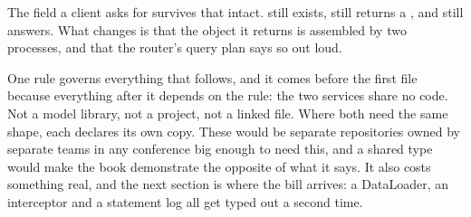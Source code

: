 %
The field a client asks for survives that intact.  still
exists, still returns a , and still answers. What changes is that
the object it returns is assembled by two processes, and that the router's
query plan says so out loud.

%
One rule governs everything that follows, and it comes before the first file
because everything after it depends on the rule: the two services share no code.
Not a model library, not a  project, not a linked file. Where
both need the same shape, each declares its own copy. These would be separate
repositories owned by separate teams in any conference big enough to need
this, and a shared type would make the book demonstrate the opposite of what
it says. It also costs something real, and the next section is where the
bill arrives: a DataLoader, an interceptor and a statement log all get typed
out a second time.
%
